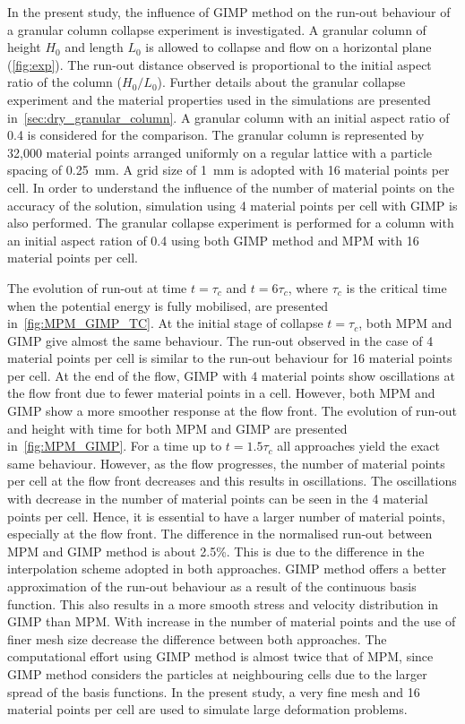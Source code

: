 In the present study, the influence of GIMP method on the run-out behaviour of 
a granular column collapse experiment is investigated. A granular column of 
height $H_0$ and length $L_0$ is allowed to collapse and flow on a horizontal 
plane (\cref{fig:exp}). The run-out distance observed is proportional to the 
initial aspect ratio of the column ($H_0/L_0$). Further details about the 
granular collapse experiment and the material properties used in the 
simulations are presented in~\cref{sec:dry_granular_column}. A 
granular column with an initial aspect ratio of 0.4 is considered for the 
comparison. The granular column is represented by 32,000 material points 
arranged uniformly on a regular lattice with a particle spacing of 
0.25~\si{\mm}. A grid size of 1~\si{mm} is adopted with 16 material points per 
cell. In order to understand the influence of the number of material points on 
the accuracy of the solution, simulation using 4 material points per cell with 
GIMP is also performed. The granular collapse experiment is performed for a 
column with an initial aspect ration of 0.4 using both GIMP method and MPM with 
16 material points per cell. 

The evolution of run-out at time $t=\tau_c$ and $t=6\tau_c$, where $\tau_c$ is 
the critical time when the potential energy is fully mobilised, are presented 
in~\cref{fig:MPM_GIMP_TC}. At the initial stage of collapse $t=\tau_c$, both 
MPM and GIMP give almost the same behaviour. The run-out observed in the case 
of 4 material points per cell is similar to the run-out behaviour for 16 
material points per cell. At the end of the flow, GIMP with 4 material points 
show oscillations at the flow front due to fewer material points in a cell. 
However, both MPM and GIMP show a more smoother response at the flow front. The 
evolution of run-out and height with time for both MPM and GIMP are presented 
in~\cref{fig:MPM_GIMP}. For a time up to $t=1.5\tau_c$ all approaches yield the 
exact same behaviour. However, as the flow progresses, the number of material 
points per cell at the flow front decreases and this results in oscillations. 
The oscillations with decrease in the number of material points can be seen in 
the 4 material points per cell. Hence, it is essential to have a larger number 
of material points, especially at the flow front. The difference in the 
normalised run-out between MPM and GIMP method is about 2.5\%. This is due to 
the difference in the interpolation scheme adopted in both approaches. GIMP 
method offers a better approximation of the run-out behaviour as a result of 
the continuous basis function. This also results in a more smooth stress and 
velocity distribution in GIMP than MPM. With increase in the number of material 
points and the use of finer mesh size decrease the difference between both 
approaches. The computational effort using GIMP method is almost twice that of 
MPM, since GIMP method considers the particles at neighbouring cells due to the 
larger spread of the basis functions. In the present study, a very fine mesh 
and 16 material points per cell are used to simulate large deformation 
problems. 

